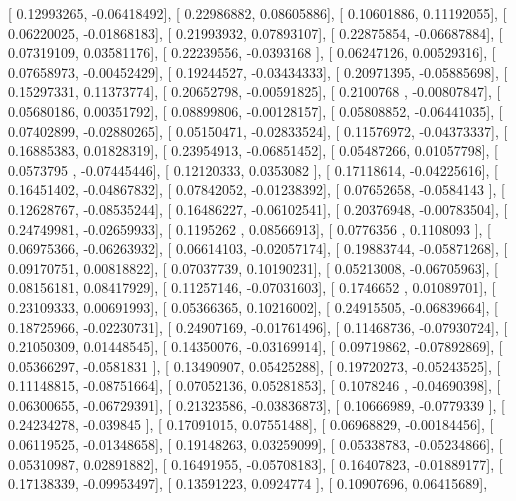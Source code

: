 \documentclass{article}
\begin{document}
       [ 0.12993265, -0.06418492],
       [ 0.22986882,  0.08605886],
       [ 0.10601886,  0.11192055],
       [ 0.06220025, -0.01868183],
       [ 0.21993932,  0.07893107],
       [ 0.22875854, -0.06687884],
       [ 0.07319109,  0.03581176],
       [ 0.22239556, -0.0393168 ],
       [ 0.06247126,  0.00529316],
       [ 0.07658973, -0.00452429],
       [ 0.19244527, -0.03434333],
       [ 0.20971395, -0.05885698],
       [ 0.15297331,  0.11373774],
       [ 0.20652798, -0.00591825],
       [ 0.2100768 , -0.00807847],
       [ 0.05680186,  0.00351792],
       [ 0.08899806, -0.00128157],
       [ 0.05808852, -0.06441035],
       [ 0.07402899, -0.02880265],
       [ 0.05150471, -0.02833524],
       [ 0.11576972, -0.04373337],
       [ 0.16885383,  0.01828319],
       [ 0.23954913, -0.06851452],
       [ 0.05487266,  0.01057798],
       [ 0.0573795 , -0.07445446],
       [ 0.12120333,  0.0353082 ],
       [ 0.17118614, -0.04225616],
       [ 0.16451402, -0.04867832],
       [ 0.07842052, -0.01238392],
       [ 0.07652658, -0.0584143 ],
       [ 0.12628767, -0.08535244],
       [ 0.16486227, -0.06102541],
       [ 0.20376948, -0.00783504],
       [ 0.24749981, -0.02659933],
       [ 0.1195262 ,  0.08566913],
       [ 0.0776356 ,  0.1108093 ],
       [ 0.06975366, -0.06263932],
       [ 0.06614103, -0.02057174],
       [ 0.19883744, -0.05871268],
       [ 0.09170751,  0.00818822],
       [ 0.07037739,  0.10190231],
       [ 0.05213008, -0.06705963],
       [ 0.08156181,  0.08417929],
       [ 0.11257146, -0.07031603],
       [ 0.1746652 ,  0.01089701],
       [ 0.23109333,  0.00691993],
       [ 0.05366365,  0.10216002],
       [ 0.24915505, -0.06839664],
       [ 0.18725966, -0.02230731],
       [ 0.24907169, -0.01761496],
       [ 0.11468736, -0.07930724],
       [ 0.21050309,  0.01448545],
       [ 0.14350076, -0.03169914],
       [ 0.09719862, -0.07892869],
       [ 0.05366297, -0.0581831 ],
       [ 0.13490907,  0.05425288],
       [ 0.19720273, -0.05243525],
       [ 0.11148815, -0.08751664],
       [ 0.07052136,  0.05281853],
       [ 0.1078246 , -0.04690398],
       [ 0.06300655, -0.06729391],
       [ 0.21323586, -0.03836873],
       [ 0.10666989, -0.0779339 ],
       [ 0.24234278, -0.039845  ],
       [ 0.17091015,  0.07551488],
       [ 0.06968829, -0.00184456],
       [ 0.06119525, -0.01348658],
       [ 0.19148263,  0.03259099],
       [ 0.05338783, -0.05234866],
       [ 0.05310987,  0.02891882],
       [ 0.16491955, -0.05708183],
       [ 0.16407823, -0.01889177],
       [ 0.17138339, -0.09953497],
       [ 0.13591223,  0.0924774 ],
       [ 0.10907696,  0.06415689],
\end{document}
